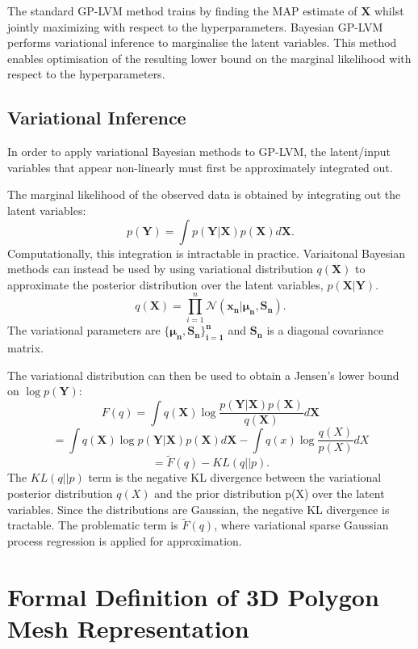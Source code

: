\documentclass[ %
                    author={Dillon Keith Diep [INCOMPLETE DRAFT, NOT FOR SUBMISSION]},
                supervisor={Dr. Carl Henrik Ek},
                    degree={MEng},
                     title={ARt-CG:},
                  subtitle={Assisted Real-time Content Generation of 3D Hair by Learning Manifolds},
                      type={Research},
                      year={2014} ]{dissertation}
\begin{document}
The standard GP-LVM method trains by finding the MAP estimate of $\mathbf{X}$ whilst jointly maximizing with respect to the hyperparameters. Bayesian GP-LVM performs variational inference to marginalise the latent variables. This method enables optimisation of the resulting lower bound on the marginal likelihood with respect to the hyperparameters. 

\subsection{Variational Inference}
{ \color{red}In order to apply variational Bayesian methods to GP-LVM, the latent/input variables that appear non-linearly must first be approximately integrated out.}

The marginal likelihood of the observed data is obtained by integrating out the latent variables:
$$p(\mathbf{Y})=\int p(\mathbf{Y|X})p(\mathbf{X})d\mathbf{X}.$$
Computationally, this integration is intractable in practice. Variaitonal Bayesian methods can instead be used by using variational distribution $q(\mathbf{X})$ to approximate the posterior distribution over the latent variables, $p(\mathbf{X|Y})$.
$$q(\mathbf{X})=\prod^n_{i=1}\mathcal{N}(\mathbf{x_n|\mu_n,S_n}).$$
The variational parameters are $\mathbf{ \{ \mu_n,S_n \}^n_{i=1} }$ and $\mathbf{S_n}$ is a diagonal covariance matrix. 

The variational distribution can then be used to obtain a Jensen's lower bound on $\log p(\mathbf{Y})$:
$$F(q)=\int q(\mathbf{X})\log \frac{ p(\mathbf{Y|X})p(\mathbf{X}) }{ q(\mathbf{X}) } d\mathbf{X}$$
$$=\int q(\mathbf{X})\log p(\mathbf{Y|X})p(\mathbf{X})d\mathbf{X} - \int q(x)\log\frac{q(X)}{p(X)}dX$$
$$=\tilde{F}(q)-KL(q||p).$$
The $KL(q||p)$ term is the negative KL divergence between the variational posterior distribution $q(X)$ and the prior distribution p(X) over the latent variables. Since the distributions are Gaussian, the negative KL divergence is tractable. The problematic term is $\tilde{F}(q)$, where variational sparse Gaussian process regression is applied for approximation.

\section{Formal Definition of 3D Polygon Mesh Representation}
\end{document}

